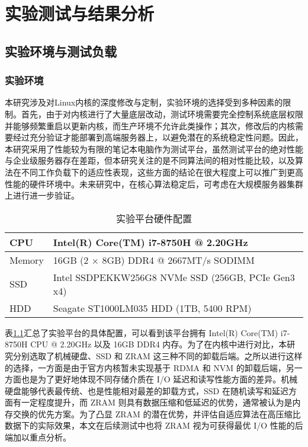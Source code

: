 
\chapter{实验测试与结果分析}

\section{实验环境与测试负载}

\subsection{实验环境}

本研究涉及对Linux内核的深度修改与定制，实验环境的选择受到多种因素的限制。首先，由于对内核进行了大量底层改动，测试环境需要完全控制系统底层权限并能够频繁重启以更新内核，而生产环境不允许此类操作；其次，修改后的内核需要经过充分验证才能部署到高端服务器上，以避免潜在的系统稳定性问题。因此，本研究采用了性能较为有限的笔记本电脑作为测试平台，虽然测试平台的绝对性能与企业级服务器存在差距，但本研究关注的是不同算法间的相对性能比较，以及算法在不同工作负载下的适应性表现，这些方面的结论在很大程度上可以推广到更高性能的硬件环境中。未来研究中，在核心算法稳定后，可考虑在大规模服务器集群上进行进一步验证。

\begin{table}[ht]
    \centering
    \caption{实验平台硬件配置}
    \label{tab:hardware_config}
    \begin{tabular}{ll}
        \toprule
        CPU & Intel(R) Core(TM) i7-8750H @ 2.20GHz \\
        \midrule
        Memory & 16GB (2 \(\times\) 8GB) DDR4 @ 2667MT/s SODIMM \\
        \midrule
        SSD & Intel SSDPEKKW256G8 NVMe SSD (256GB, PCIe Gen3 x4)  \\
        \midrule
        HDD & Seagate ST1000LM035 HDD (1TB, 5400 RPM) \\
        \bottomrule
    \end{tabular}
\end{table}
表\ref{tab:hardware_config}汇总了实验平台的具体配置，可以看到该平台拥有 Intel(R) Core(TM) i7-8750H CPU @ 2.20GHz 以及 16GB DDR4 内存。为了在内核中进行对比，本研究分别选取了机械硬盘、SSD 和 ZRAM 这三种不同的卸载后端。之所以进行这样的选择，一方面是由于官方内核暂未实现基于 RDMA 和 NVM 的卸载后端，另一方面也是为了更好地体现不同存储介质在 I/O 延迟和读写性能方面的差异。机械硬盘能够代表最传统、也是性能相对最差的卸载方式，SSD 在随机读写和延迟方面有一定程度提升，而 ZRAM 则具有数据压缩和低延迟的优势，通常被认为是内存交换的优先方案。为了凸显 ZRAM 的潜在优势，并评估自适应算法在高压缩比数据下的实际效果，本文在后续测试中也将 ZRAM 视为可获得最优 I/O 性能的后端加以重点分析。


